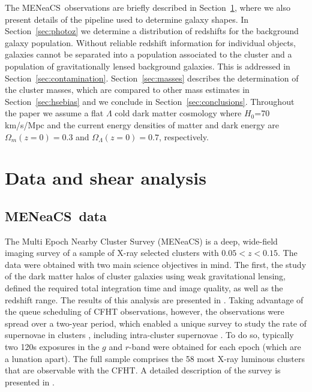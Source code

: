 \documentclass[useAMS,usenatbib]{mnras}
\newcommand{\mn}{MENeaCS}
\begin{document}
The \mn \ observations are briefly described in Section~\ref{sec:data}, where we also present details of the pipeline used to determine galaxy shapes. 
In Section~\ref{sec:photoz} we determine a distribution of redshifts for the background galaxy population. Without reliable redshift information for individual objects, galaxies cannot be separated into a population associated to the cluster and a population of gravitationally lensed background galaxies. This is addressed in Section~\ref{sec:contamination}. Section~\ref{sec:masses} describes the determination of the cluster masses, which are compared to other mass estimates in Section~\ref{sec:hsebias} and we conclude in Section~\ref{sec:conclusions}. Throughout the paper we assume a flat $\Lambda$ cold dark matter cosmology where $H_0$=70 km/s/Mpc and the current energy densities of matter and dark energy are $\Omega_m(z=0)=0.3$ and $\Omega_\Lambda(z=0)=0.7$, respectively. 



\section{Data and shear analysis}
\label{sec:data}

\subsection{\mn \ data}

The Multi Epoch Nearby Cluster Survey (\mn) is a deep, wide-field imaging survey of a sample of X-ray selected clusters with $0.05<z<0.15$. The data were obtained with two main science objectives in mind. The first, the study of the dark matter halos of cluster galaxies using weak gravitational lensing, defined the required total integration time and image quality, as well as the redshift range. The results of this analysis are presented in \citet{sifon18b, sifon18}. Taking advantage of the queue scheduling of CFHT observations, however, the observations were spread over a two-year period, which enabled a unique survey to study the rate of supernovae in clusters \citep{sand12, graham12, graham15}, including intra-cluster supernovae \citep{sand11}. To do so, typically two 120s exposures in the $g$ and $r$-band were obtained for each epoch (which are a lunation apart).  
The full sample comprises the 58 most X-ray luminous clusters that are observable with the CFHT. A detailed description of the survey is presented in \citet{sand11, sand12}. 
\end{document}
